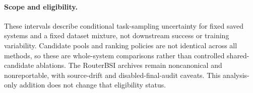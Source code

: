 \paragraph{Scope and eligibility.}
These intervals describe conditional task-sampling uncertainty for fixed saved systems and a fixed dataset mixture, not downstream success or training variability. Candidate pools and ranking policies are not identical across all methods, so these are whole-system comparisons rather than controlled shared-candidate ablations. The RouterBSI archives remain noncanonical and nonreportable, with source-drift and disabled-final-audit caveats. This analysis-only addition does not change that eligibility status.


